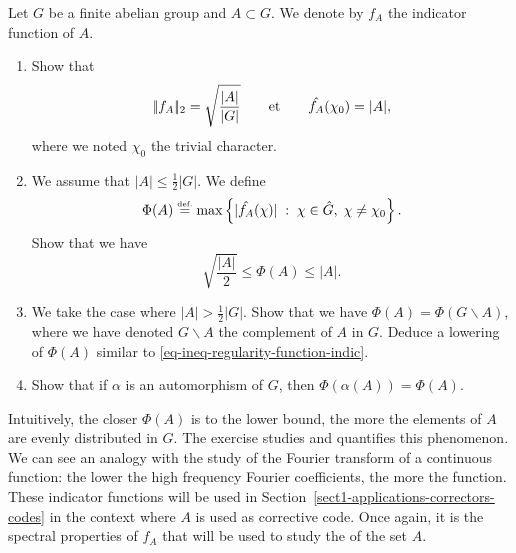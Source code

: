 \begin{exo}
\label{exo-indicator-functions}

 Let $G$ be a finite abelian group and $ A \subset G$. We denote by $ f_A $ the indicator function of $A$. \begin{enumerate}
\item Show that
\begin{equation*}
|\!| f_A |\!|_2 = \sqrt{\frac{|A|}{|G|}} \quad \quad \text{et} \quad \quad \hat{f_A}(\chi_0) = |A|,
\end{equation*}
where we noted $\chi_0 $ the trivial character.
\item We assume that $|A|\leq \frac{1}{2}|G|$. We define
\begin{equation}
\label{eq-defn-phi-ensemble}
\Phi(A) \stackrel{\mbox{\upshape\tiny def.}}{=} \max \left\{ |\hat{f_A}(\chi)| \;:\; \chi \in \hat{G}, \; \chi \neq \chi_0 \right\}.
\end{equation}
Show that we have
\begin{equation}
\label{eq-ineq-regularity-function-indic}
\sqrt{\frac{|A|}{2}} \leq \Phi(A) \leq |A|.
\end{equation}

\item We take the case where $|A| > \frac{1}{2}|G|$. Show that we have $\Phi(A) = \Phi(G \backslash A)$, where we have denoted $ G \backslash A $ the complement of $A$ in $G$. Deduce a lowering of $\Phi(A)$ similar to \eqref{eq-ineq-regularity-function-indic}.
\item Show that if $\alpha$ is an automorphism of $G$, then $\Phi(\alpha (A)) = \Phi(A)$.
\end{enumerate} Intuitively, the closer $\Phi(A)$ is to the lower bound, the more the elements of $A$ are evenly distributed in $G$. The exercise  studies and quantifies this phenomenon. We can see an analogy with the study of the Fourier transform of a continuous function: the lower the high frequency Fourier coefficients, the more  the function. These indicator functions will be used in Section~\ref{sect1-applications-correctors-codes} in the context where $A$ is used as corrective code. Once again, it is the spectral properties of $ f_A $ that will be used to study the  of the set $A$.
\end{exo}


